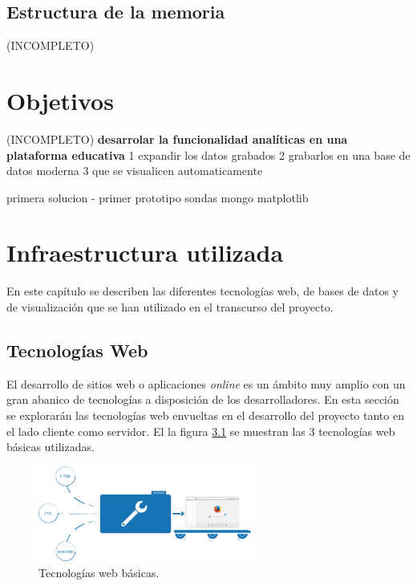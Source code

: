 \documentclass[a4paper, 12pt]{book}
\begin{document}
	\section{Estructura de la memoria}
	\label{sec:estructura_memoria}
		(INCOMPLETO)
	
	
	
	\cleardoublepage 
	\chapter{Objetivos} 
	\label{chap:objetivos} 
		(INCOMPLETO)
		\textbf{desarrolar la funcionalidad analíticas en una plataforma educativa}
		1 expandir los datos grabados
		2 grabarlos en una base de datos moderna
		3 que se visualicen automaticamente
		
		primera solucion - primer prototipo 
		sondas
		mongo
		matplotlib
		
		
	\cleardoublepage 
	\chapter{Infraestructura utilizada} 
	\label{chap:infraestructura_utilizada} 
		En este capítulo se describen las diferentes tecnologías web, de bases de datos y de visualización que se han utilizado en el transcurso del proyecto.
		
	\section{Tecnologías Web} 
	\label{sec:tecnologias_web} 
		El desarrollo de sitios web o aplicaciones \textit{online} es un ámbito muy amplio con un gran abanico de tecnologías a disposición de los desarrolladores. En esta sección se explorarán las tecnologías web envueltas en el desarrollo del proyecto tanto en el lado cliente como servidor. El la figura \ref{fig:HTML_CSS_JS} se muestran las 3 tecnologías web básicas utilizadas.
		
		\begin{figure}[H]
			\centering
			\includegraphics[width=7cm, keepaspectratio]{img/html_css_js.png}
			\caption{Tecnologías web básicas.}
			\label{fig:HTML_CSS_JS}
		\end{figure}
	
\end{document}

